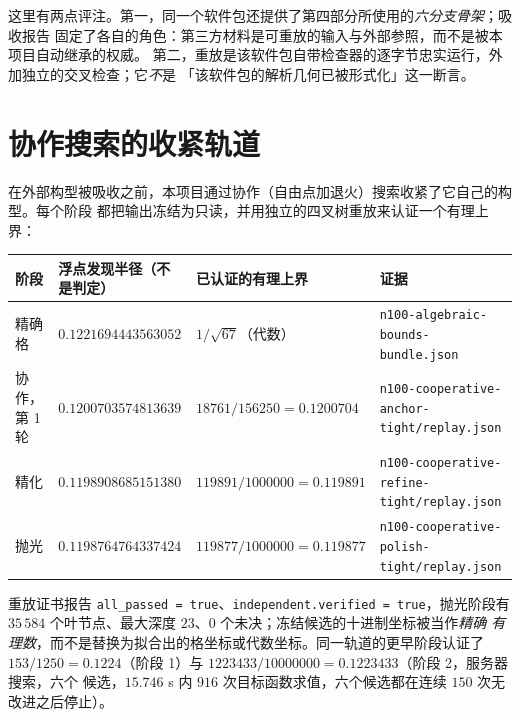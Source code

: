 这里有两点评注。第一，同一个软件包还提供了第四部分所使用的\emph{六分支骨架}；吸收报告
固定了各自的角色：第三方材料是可重放的输入与外部参照，而不是被本项目自动继承的权威。
第二，重放是该软件包自带检查器的逐字节忠实运行，外加独立的交叉检查；它\emph{不}是
「该软件包的解析几何已被形式化」这一断言。

\section{协作搜索的收紧轨道}

在外部构型被吸收之前，本项目通过协作（自由点加退火）搜索收紧了它自己的构型。每个阶段
都把输出冻结为只读，并用独立的四叉树重放来认证一个有理上界：

\begin{center}
\footnotesize
\begin{tabular}{@{}>{\raggedright\arraybackslash}p{}>{\raggedright\arraybackslash}p{}>{\raggedright\arraybackslash}p{}>{\raggedright\arraybackslash}p{}@{}}
\toprule
阶段 & 浮点发现半径（不是判定） & 已认证的有理上界 & 证据 \\
\midrule
精确格 & $0.1221694443563052$ & $1/\sqrt{67}$（代数） &
\texttt{n100-\allowbreak{}algebraic-\allowbreak{}bounds-\allowbreak{}bundle.json} \\
协作，第 1 轮 & $0.1200703574813639$ & $18761/156250=0.1200704$ &
\texttt{n100-\allowbreak{}cooperative-\allowbreak{}anchor-\allowbreak{}tight/\allowbreak{}replay.json} \\
精化 & $0.1198908685151380$ & $119891/1000000=0.119891$ &
\texttt{n100-\allowbreak{}cooperative-\allowbreak{}refine-\allowbreak{}tight/\allowbreak{}replay.json} \\
抛光 & $0.1198764764337424$ & $119877/1000000=0.119877$ &
\texttt{n100-\allowbreak{}cooperative-\allowbreak{}polish-\allowbreak{}tight/\allowbreak{}replay.json} \\
\bottomrule
\end{tabular}
\end{center}

重放证书报告 \texttt{all\_\allowbreak{}passed = true}、\texttt{independent.verified = true}，抛光阶段有
$35\,584$ 个叶节点、最大深度 $23$、$0$ 个未决；冻结候选的十进制坐标被当作\emph{精确
有理数}，而不是替换为拟合出的格坐标或代数坐标。同一轨道的更早阶段认证了
$153/1250=0.1224$（阶段 1）与 $1223433/10000000=0.1223433$（阶段 2，服务器搜索，六个
候选，$15.746$ s 内 $916$ 次目标函数求值，六个候选都在连续 $150$ 次无改进之后停止）。

